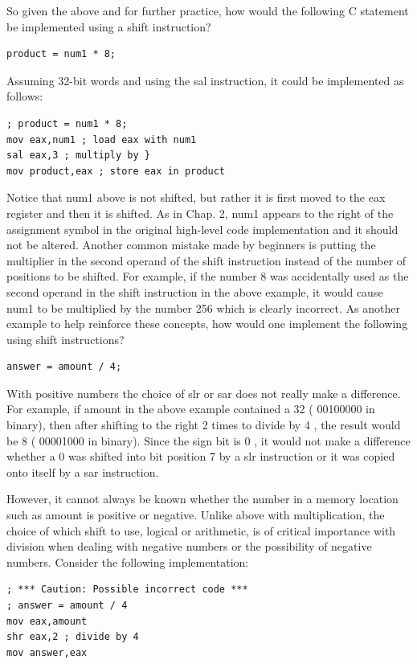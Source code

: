 \documentclass[10pt]{book}
\begin{document}
\begin{center}
\begin{center}
So given the above and for further practice, how would the following C statement be implemented using a shift instruction?

\begin{verbatim}
product = num1 * 8;
\end{verbatim}

Assuming 32-bit words and using the sal instruction, it could be implemented as follows:

\begin{verbatim}
; product = num1 * 8;
mov eax,num1 ; load eax with num1
sal eax,3 ; multiply by }
mov product,eax ; store eax in product
\end{verbatim}

Notice that num1 above is not shifted, but rather it is first moved to the eax register and then it is shifted. As in Chap. 2, num1 appears to the right of the assignment symbol in the original high-level code implementation and it should not be altered. Another common mistake made by beginners is putting the multiplier in the second operand of the shift instruction instead of the number of positions to be shifted. For example, if the number 8 was accidentally used as the second operand in the shift instruction in the above example, it would cause num1 to be multiplied by the number 256 which is clearly incorrect. As another example to help reinforce these concepts, how would one implement the following using shift instructions?

\begin{verbatim}
answer = amount / 4;
\end{verbatim}

With positive numbers the choice of slr or sar does not really make a difference. For example, if amount in the above example contained a 32 ( 00100000 in binary), then after shifting to the right 2 times to divide by 4 , the result would be 8 ( 00001000 in binary). Since the sign bit is 0 , it would not make a difference whether a 0 was shifted into bit position 7 by a slr instruction or it was copied onto itself by a sar instruction.

However, it cannot always be known whether the number in a memory location such as amount is positive or negative. Unlike above with multiplication, the choice of which shift to use, logical or arithmetic, is of critical importance with division when dealing with negative numbers or the possibility of negative numbers. Consider the following implementation:

\begin{verbatim}
; *** Caution: Possible incorrect code ***
; answer = amount / 4
mov eax,amount
shr eax,2 ; divide by 4
mov answer,eax
\end{verbatim}


\end{center}
\end{center}
\end{document}
